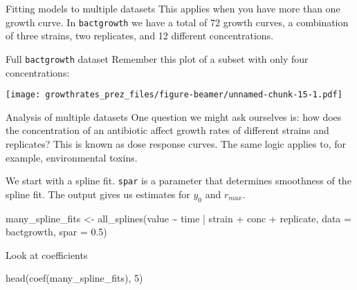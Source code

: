 \documentclass[
  ignorenonframetext,
]{beamer}
\newenvironment{Shaded}{\begin{snugshade}}{\end{snugshade}}
\newcommand{\AttributeTok}[1]{\textcolor[rgb]{0.77,0.63,0.00}{#1}}
\newcommand{\DecValTok}[1]{\textcolor[rgb]{0.00,0.00,0.81}{#1}}
\newcommand{\FloatTok}[1]{\textcolor[rgb]{0.00,0.00,0.81}{#1}}
\newcommand{\FunctionTok}[1]{\textcolor[rgb]{0.00,0.00,0.00}{#1}}
\newcommand{\NormalTok}[1]{#1}
\newcommand{\OtherTok}[1]{\textcolor[rgb]{0.56,0.35,0.01}{#1}}
\newcommand{\SpecialCharTok}[1]{\textcolor[rgb]{0.00,0.00,0.00}{#1}}
\begin{document}
\begin{frame}[fragile]{Fitting models to multiple datasets}
\protect\hypertarget{fitting-models-to-multiple-datasets}{}
This applies when you have more than one growth curve. In
\texttt{bactgrowth} we have a total of 72 growth curves, a combination
of three strains, two replicates, and 12 different concentrations.
\end{frame}

\begin{frame}{Full \texttt{bactgrowth} dataset}
\protect\hypertarget{full-bactgrowth-dataset}{}
Remember this plot of a subset with only four concentrations:

\texttt{[image: growthrates\_prez\_files/figure-beamer/unnamed-chunk-15-1.pdf]}
\end{frame}

\begin{frame}[fragile]{Analysis of multiple datasets}
\protect\hypertarget{analysis-of-multiple-datasets}{}
One question we might ask ourselves is: how does the concentration of an
antibiotic affect growth rates of different strains and replicates? This
is known as dose response curves. The same logic applies to, for
example, environmental toxins.

We start with a spline fit. \texttt{spar} is a parameter that determines
smoothness of the spline fit. The output gives us estimates for \(y_0\)
and \(r_{max}\).

\begin{Shaded}
\begin{Highlighting}[]
\NormalTok{many\_spline\_fits }\OtherTok{\textless{}{-}} \FunctionTok{all\_splines}\NormalTok{(value }\SpecialCharTok{\textasciitilde{}}\NormalTok{ time }\SpecialCharTok{|} 
\NormalTok{                                  strain }\SpecialCharTok{+}\NormalTok{ conc }\SpecialCharTok{+}\NormalTok{ replicate,}
                                \AttributeTok{data =}\NormalTok{ bactgrowth, }\AttributeTok{spar =} \FloatTok{0.5}\NormalTok{)}
\end{Highlighting}
\end{Shaded}
\end{frame}

\begin{frame}[fragile]{Look at coefficients}
\protect\hypertarget{look-at-coefficients}{}
\begin{Shaded}
\begin{Highlighting}[]
\FunctionTok{head}\NormalTok{(}\FunctionTok{coef}\NormalTok{(many\_spline\_fits), }\DecValTok{5}\NormalTok{)}
\end{Highlighting}
\end{Shaded}
\end{frame}
\end{document}
